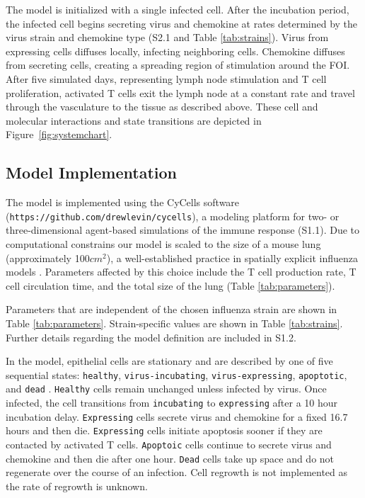 \documentclass[10pt]{article}
\begin{document}
The model is initialized with a single infected cell.  After the incubation period, the infected cell begins secreting virus and chemokine at rates determined by the virus strain and chemokine type (S2.1 and Table \ref{tab:strains}).  Virus from expressing cells diffuses locally, infecting neighboring cells. Chemokine diffuses from secreting cells, creating a spreading region of stimulation around the FOI. After five simulated days, representing lymph node stimulation and T cell proliferation, activated T cells exit the lymph node at a constant rate and travel through the vasculature to the tissue as described above.  These cell and molecular interactions and state transitions are depicted in Figure~\ref{fig:systemchart}.

\subsection*{Model Implementation}

The model is implemented using the CyCells software \cite{Warrender2006} (\texttt{https://github.com/drewlevin/cycells}), a modeling platform for two- or three-dimensional agent-based simulations of the immune response (S1.1).  Due to computational constrains our model is scaled to the size of a mouse lung (approximately 100$cm^2$), a well-established practice in spatially explicit influenza models \cite{Miller2003, Allan2006, Ingulli2009}.  Parameters affected by this choice include the T cell production rate, T cell circulation time, and the total size of the lung (Table \ref{tab:parameters}).

Parameters that are independent of the chosen influenza strain are shown in Table \ref{tab:parameters}.  Strain-specific values are shown in Table \ref{tab:strains}.  Further details regarding the model definition are included in S1.2.

In the model, epithelial cells are stationary and are described by one of five sequential states: \texttt{healthy}, \texttt{virus-incubating}, \texttt{virus-expressing}, \texttt{apoptotic}, and \texttt{dead} \cite{bachem1996simulated, Beauchemin2005, Mitchell2011}. \texttt{Healthy} cells remain unchanged unless infected by virus. Once infected, the cell transitions from \texttt{incubating} to \texttt{expressing} after a 10 hour incubation delay. \texttt{Expressing} cells secrete virus and chemokine for a fixed 16.7 hours and then die. \texttt{Expressing} cells initiate apoptosis sooner if they are contacted by activated T cells. \texttt{Apoptoic} cells continue to secrete virus and chemokine and then die after one hour. \texttt{Dead} cells take up space and do not regenerate over the course of an infection.  Cell regrowth is not implemented as the rate of regrowth is unknown. 
\end{document}
